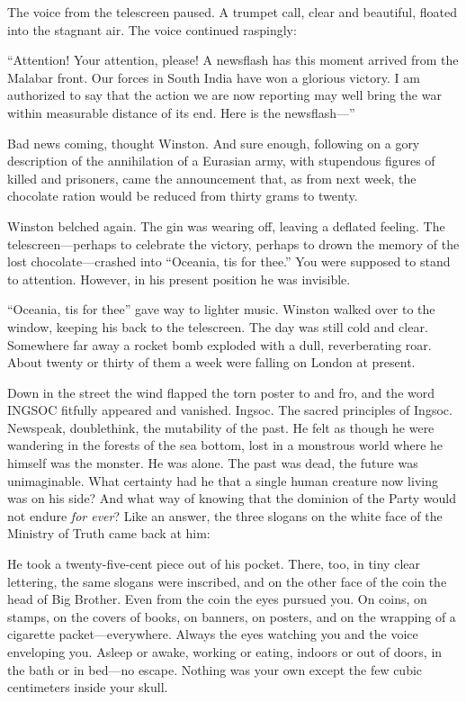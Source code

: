 The voice from the telescreen paused. A trumpet call, clear and
beautiful, floated into the stagnant air. The voice continued raspingly:

``Attention! Your attention, please! A newsflash has this moment arrived
from the Malabar front. Our forces in South India have won a glorious
victory. I am authorized to say that the action we are now reporting may
well bring the war within measurable distance of its end. Here is the
newsflash---''

Bad news coming, thought Winston. And sure enough, following on a gory
description of the annihilation of a Eurasian army, with stupendous
figures of killed and prisoners, came the announcement that, as from
next week, the chocolate ration would be reduced from thirty grams to
twenty.

Winston belched again. The gin was wearing off, leaving a deflated
feeling. The telescreen---perhaps to celebrate the victory, perhaps to
drown the memory of the lost chocolate---crashed into ``Oceania,
\textquotesingle tis for thee.'' You were supposed to stand to attention.
However, in his present position he was invisible.

``Oceania, \textquotesingle tis for thee'' gave way to lighter music.
Winston walked over to the window, keeping his back to the telescreen.
The day was still cold and clear. Somewhere far away a rocket bomb
exploded with a dull, reverberating roar. About twenty or thirty of them
a week were falling on London at present.

Down in the street the wind flapped the torn poster to and fro, and the
word INGSOC fitfully appeared and vanished. Ingsoc. The sacred
principles of Ingsoc. Newspeak, doublethink, the mutability of the past.
He felt as though he were wandering in the forests of the sea bottom,
lost in a monstrous world where he himself was the monster. He was
alone. The past was dead, the future was unimaginable. What certainty
had he that a single human creature now living was on his side? And what
way of knowing that the dominion of the Party would not endure \emph{for
ever}? Like an answer, the three slogans on the white face of the
Ministry of Truth came back at him:


He took a twenty-five-cent piece out of his pocket. There, too, in tiny
clear lettering, the same slogans were inscribed, and on the other face
of the coin the head of Big Brother. Even from the coin the eyes pursued
you. On coins, on stamps, on the covers of books, on banners, on
posters, and on the wrapping of a cigarette packet---everywhere. Always
the eyes watching you and the voice enveloping you. Asleep or awake,
working or eating, indoors or out of doors, in the bath or in bed---no
escape. Nothing was your own except the few cubic centimeters inside
your skull.

